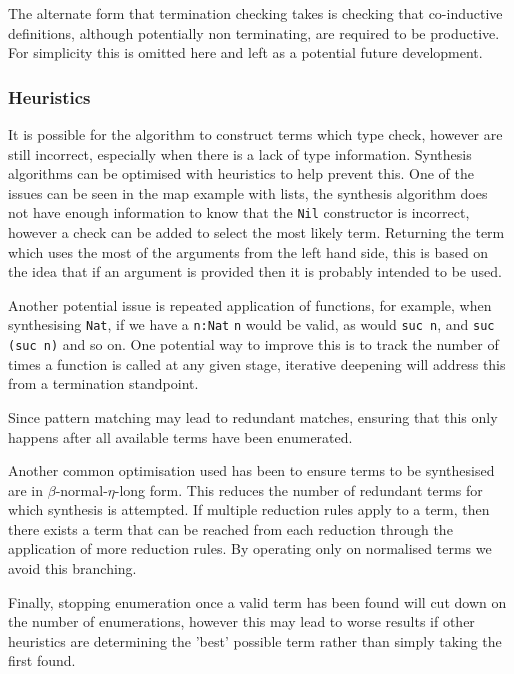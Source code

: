 \documentclass[a4paper]{article}
\begin{document}
The alternate form that termination checking takes is checking that co-inductive definitions, although potentially non 
terminating, are required to be productive. For simplicity this is omitted here and left as a potential future development.
\subsubsection{Heuristics}
\label{sec:org54b6634}
It is possible for the algorithm to construct terms which type check, however are still incorrect, especially 
when there is a lack of type information. Synthesis algorithms can be optimised with heuristics to help prevent this.
One of the issues can be seen in the map example with lists, the synthesis algorithm does not have enough information to 
know that the \texttt{Nil} constructor is incorrect, however a check can be added to select the most likely term.
Returning the term which uses the most of the arguments from the left hand side, this is based on the idea that 
if an argument is provided then it is probably intended to be used. 

Another potential issue is repeated application of functions, for example, when synthesising \texttt{Nat}, if we have a \texttt{n:Nat}
\texttt{n} would be valid, as would \texttt{suc n}, and \texttt{suc (suc n)} and so on. One potential way to improve this is to track the number 
of times a function is called at any given stage, iterative deepening will address this from a termination standpoint.

Since pattern matching may lead to redundant matches, ensuring that this only happens after all available terms 
have been enumerated. 

Another common optimisation used has been to ensure terms to be synthesised are in \(\beta\)-normal-\(\eta\)-long form. This 
reduces the number of redundant terms for which synthesis is attempted. If multiple reduction rules apply to a term,
then there exists a term that can be reached from each reduction through the application of more reduction rules. \cite{10.5555/2788232}
By operating only on normalised terms we avoid this branching.

Finally, stopping enumeration once a valid term has been found will cut down on the 
number of enumerations, however this may lead to worse results if other heuristics are determining the 'best' possible
term rather than simply taking the first found. 
\end{document}
